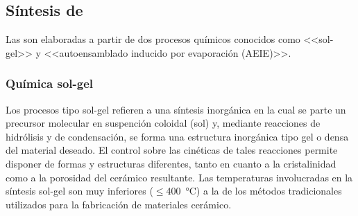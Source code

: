 	\subsection{Síntesis de \pdm}

	Las \pdm\space son elaboradas a partir de dos procesos químicos conocidos como <<sol-gel>> y <<autoensamblado inducido por evaporación (AEIE)>>.

	\subsubsection{Química sol-gel}

	Los procesos tipo sol-gel refieren a una síntesis inorgánica en la cual se parte un precursor molecular en suspención coloidal (sol) y, mediante reacciones de hidrólisis y de condensación, se  forma una estructura inorgánica tipo gel o densa del material deseado. El control sobre las cinéticas de tales reacciones permite disponer de formas y estructuras diferentes, tanto en cuanto a la cristalinidad como a la porosidad del cerámico resultante. Las temperaturas involucradas en la síntesis sol-gel son muy inferiores ($\leq$\SI{400}{\celsius}) a la de los métodos tradicionales utilizados para la fabricación de materiales cerámico.\cite{Brinker1990,Jolivet2000,Wright2001} 

	
	


		




	 	
